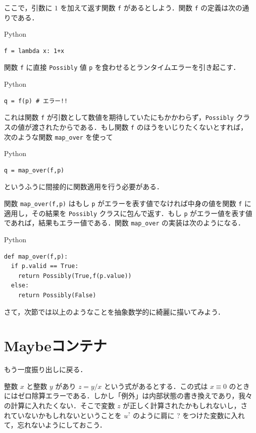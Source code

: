 \documentclass[a4paper]{jsbook}
\newcommand{\programminglanguage}[1]{\textsf{#1}}
\newcommand{\python}{\programminglanguage{Python}}
\newcommand{\code}[1]{\texttt{#1}}
\newenvironment{pythoncode}{\begin{itembox}[r]{\python}}{\end{itembox}}
\newcommand{\mMaybe}[1]{{#1}^\text{?}}
\begin{document}
ここで，引数に $1$ を加えて返す関数 \code{f} があるとしよう．関数 \code{f} の定義は次の通りである．
\begin{pythoncode}
\begin{verbatim}
f = lambda x: 1+x
\end{verbatim}
\end{pythoncode}

関数 \code{f} に直接 \code{Possibly} 値 \code{p} を食わせるとランタイムエラーを引き起こす．
\begin{pythoncode}
\begin{verbatim}
q = f(p) # エラー!!
\end{verbatim}
\end{pythoncode}
これは関数 \code{f} が引数として数値を期待していたにもかかわらず，\code{Possibly} クラスの値が渡されたからである．もし関数 \code{f} のほうをいじりたくないとすれば，次のような関数 \code{map\_over} を使って
\begin{pythoncode}
\begin{verbatim}
q = map_over(f,p)
\end{verbatim}
\end{pythoncode}
というふうに間接的に関数適用を行う必要がある．

関数 \code{map\_over(f,p)} はもし \code{p} がエラーを表す値でなければ中身の値を関数 \code{f} に適用し，その結果を \code{Possibly} クラスに包んで返す．もし \code{p} がエラー値を表す値であれば，結果もエラー値である．関数 \code{map\_over} の実装は次のようになる．
\begin{pythoncode}
\begin{verbatim}
def map_over(f,p):
  if p.valid == True:
    return Possibly(True,f(p.value))
  else:
    return Possibly(False)
\end{verbatim}
\end{pythoncode}

さて，次節では以上のようなことを抽象数学的に綺麗に描いてみよう．

\section{Maybeコンテナ}

もう一度振り出しに戻る．

整数 $x$ と整数 $y$ があり $z=y/x$ という式があるとする．この式は $x\equiv0$ のときにはゼロ除算エラーである．しかし「例外」は内部状態の書き換えであり，我々の計算に入れたくない．そこで変数 $z$ が正しく計算されたかもしれないし，されていないかもしれないということを $\mMaybe{u}$ のように肩に ? をつけた変数に入れて，忘れないようにしておこう．
\end{document}
